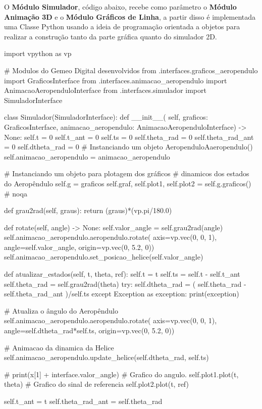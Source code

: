 \newpage

O \textbf{Módulo Simulador}, código abaixo, recebe como parâmetro  o \textbf{Módulo Animação 3D} e o \textbf{Módulo Gráficos de Linha}, a partir disso  é implementada uma Classe Python usando a ideia de programação orientada a objetos para realizar a construção tanto da parte gráfica quanto do simulador 2D.

\vspace{0.5cm}

\begin{python}

import vpython as vp

# Modulos do Gemeo Digital desenvolvidos
from .interfaces.graficos_aeropendulo import GraficosInterface
from .interfaces.animacao_aeropendulo import AnimacaoAeropenduloInterface
from .interfaces.simulador import SimuladorInterface


class Simulador(SimuladorInterface):
    def __init__(
            self, graficos: GraficosInterface,
            animacao_aeropendulo: AnimacaoAeropenduloInterface) -> None:
        self.t = 0
        self.t_ant = 0
        self.ts = 0
        self.theta_rad = 0
        self.theta_rad_ant = 0
        self.dtheta_rad = 0
        # Instanciando um objeto AeropenduloAaeropendulo()
        self.animacao_aeropendulo = animacao_aeropendulo

        # Instanciando um objeto para plotagem dos gráficos
        # dinamicos dos estados do Aeropêndulo
        self.g = graficos
        self.graf, self.plot1, self.plot2 = self.g.graficos()  # noqa

    def grau2rad(self, graus):
        return (graus)*(vp.pi/180.0)

    def rotate(self, angle) -> None:
        self.valor_angle = self.grau2rad(angle)
        self.animacao_aeropendulo.aeropendulo.rotate(
            axis=vp.vec(0, 0, 1),
            angle=self.valor_angle,
            origin=vp.vec(0, 5.2, 0))
        self.animacao_aeropendulo.set_posicao_helice(self.valor_angle)

    def atualizar_estados(self, t, theta, ref):
        self.t = t
        self.ts = self.t - self.t_ant
        self.theta_rad = self.grau2rad(theta)
        try:
            self.dtheta_rad = (
                self.theta_rad - self.theta_rad_ant
                )/self.ts
        except Exception as exception:
            print(exception)

        # Atualiza o ângulo do Aeropêndulo
        self.animacao_aeropendulo.aeropendulo.rotate(
                        axis=vp.vec(0, 0, 1),
                        angle=self.dtheta_rad*self.ts,
                        origin=vp.vec(0, 5.2, 0))

        # Animacao da dinamica da Helice
        self.animacao_aeropendulo.update_helice(self.dtheta_rad, self.ts)

        # print(x[1] + interface.valor_angle)
        # Grafico do angulo.
        self.plot1.plot(t, theta)
        # Grafico do sinal de referencia
        self.plot2.plot(t, ref)

        self.t_ant = t
        self.theta_rad_ant = self.theta_rad

\end{python}


